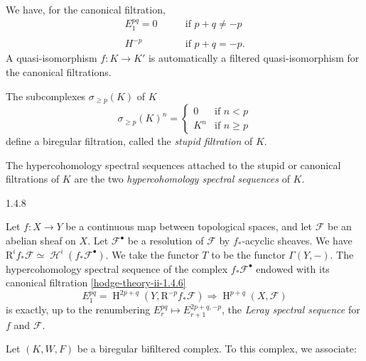     We have, for the canonical filtration,
    \[       \begin {aligned}         E_1^{pq} = 0         &\qquad \text {if }p+q\neq -p       \\\\H^{-p}         &\qquad \text {if }p+q=-p.       \end {aligned}     \]
    A quasi-isomorphism \(f\colon  K\to  K'\) is automatically a filtered quasi-isomorphism for the canonical filtrations.\label{hodge-theory-ii-1.4.7}\par{}The subcomplexes \(\sigma _{\geqslant  p}(K)\) of \(K\)
    \[       \sigma _{\geqslant  p}(K)^n       = \begin {cases}         0         &\text {if }n<p       \\K^n         &\text {if }n\geqslant  p       \end {cases}     \]
    define a biregular filtration, called the \emph{stupid filtration} of \(K\).\par{}The hypercohomology spectral sequences attached to the stupid or canonical filtrations of \(K\) are the two \emph{hypercohomology spectral sequences} of \(K\).\begin{example}{1.4.8}\label{hodge-theory-ii-1.4.8}\skipsinglepar\par{}Let \(f\colon  X\to  Y\) be a continuous map between topological spaces, and let \(\mathscr {F}\) be an abelian sheaf on \(X\).
    Let \(\mathscr {F}^\bullet \) be a resolution of \(\mathscr {F}\) by \(f_*\)-acyclic sheaves.
    We have \(\mathrm {R}^i f_*\mathscr {F}\simeq \operatorname {\mathscr {H}}^i(f_*\mathscr {F}^\bullet )\).
    We take the functor \(T\) to be the functor \(\Gamma (Y,-)\).
    The hypercohomology spectral sequence of the complex \(f_*\mathscr {F}^\bullet \) endowed with its canonical filtration \cref{hodge-theory-ii-1.4.6}
    \[       E_1^{pq}       = \operatorname {H}^{2p+q}(Y,\mathrm {R}^{-p}f_*\mathscr {F})       \Rightarrow  \operatorname {H}^{p+q}(X,\mathscr {F})     \]
    is exactly, up to the renumbering \(E_r^{pq}\mapsto  E_{r+1}^{2p+q,-p}\), the \emph{Leray spectral sequence} for \(f\) and \(\mathscr {F}\).\end{example}\label{hodge-theory-ii-1.4.9}\par{}Let \((K,W,F)\) be a biregular bifiltered complex.
    To this complex, we associate:

